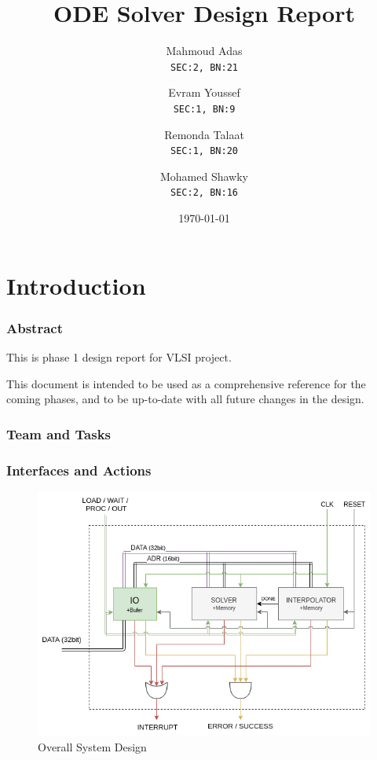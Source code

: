 \documentclass[12pt]{report}
\title{\LARGE{ODE Solver Design Report}}
\author{
  Mahmoud Adas\\
  \small\texttt{SEC:2, BN:21}
  \and
  Evram Youssef\\
  \small\texttt{SEC:1, BN:9}
  \and
  Remonda Talaat\\
  \small\texttt{SEC:1, BN:20}
  \and
  Mohamed Shawky\\
  \small\texttt{SEC:2, BN:16}
}
\date{\today}
\begin{document}
\thispagestyle{empty}

\maketitle
\tableofcontents
\listoffigures
\listoftables
\clearpage


\part{Introduction}
\section{Abstract}
This is phase 1 design report for VLSI project. 

This document is intended to be used as a comprehensive reference for the coming phases, and to be up-to-date with all future changes in the design.

\section{Team and Tasks}

\section{Interfaces and Actions}
\begin{center}
    \begin{figure}[hp]
        \centering
        \includegraphics[width=\textwidth]{d1}
        \caption{Overall System Design}
        \label{fig:overall}
    \end{figure}
\end{center}
\end{document}
